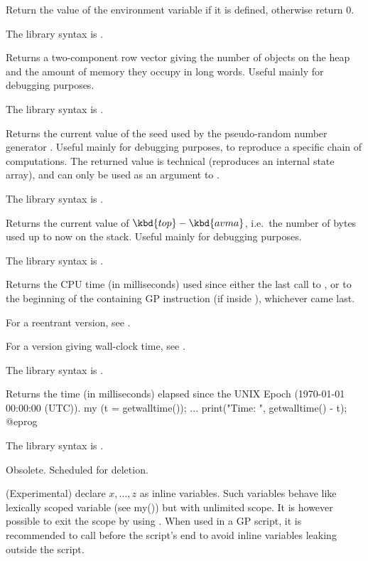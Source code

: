 \label{se:getenv}
Return the value of the environment variable  if it is defined, otherwise return 0.

The library syntax is .

\label{se:getheap}
Returns a two-component row vector giving the
number of objects on the heap and the amount of memory they occupy in long
words. Useful mainly for debugging purposes.

The library syntax is .

\label{se:getrand}
Returns the current value of the seed used by the
pseudo-random number generator . Useful mainly for debugging
purposes, to reproduce a specific chain of computations. The returned value
is technical (reproduces an internal state array), and can only be used as an
argument to .

The library syntax is .

\label{se:getstack}
Returns the current value of $\kbd{top}-\kbd{avma}$, i.e.~the number of
bytes used up to now on the stack. Useful mainly for debugging purposes.

The library syntax is .

\label{se:gettime}
Returns the CPU time (in milliseconds) used since either the last call to
, or to the beginning of the containing GP instruction (if
inside ), whichever came last.

For a reentrant version, see .

For a version giving wall-clock time, see .

The library syntax is .

\label{se:getwalltime}
Returns the time (in milliseconds) elapsed since the UNIX Epoch
(1970-01-01 00:00:00 (UTC)).
\bprog
my (t = getwalltime());
...
print("Time: ", getwalltime() - t);
@eprog

The library syntax is .

\label{se:global}
Obsolete. Scheduled for deletion.

\label{se:inline}
(Experimental) declare $x,\ldots, z$ as inline variables. Such variables
behave like lexically scoped variable (see my()) but with unlimited scope.
It is however possible to exit the scope by using .
When used in a GP script, it is recommended to call  before
the script's end to avoid inline variables leaking outside the script.

